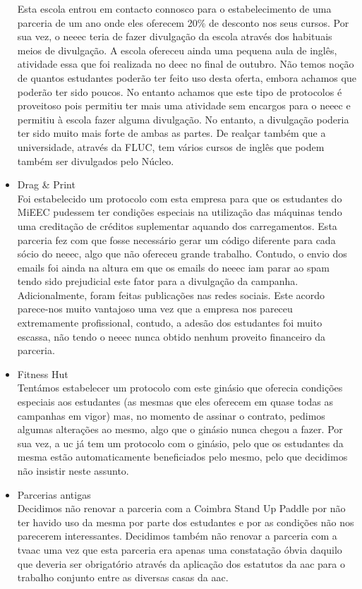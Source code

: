 \begin{itemize}
Esta escola entrou em contacto connosco para o estabelecimento de uma parceria de um ano onde eles oferecem 20\% de desconto nos seus cursos. Por sua vez, o \acrshort{neeec} teria de fazer divulgação da escola através dos habituais meios de divulgação. A escola ofereceu ainda uma pequena aula de inglês, atividade essa que foi realizada no \acrshort{deec} no final de outubro. Não temos noção de quantos estudantes poderão ter feito uso desta oferta, embora achamos que poderão ter sido poucos. No entanto achamos que este tipo de protocolos é proveitoso pois permitiu ter mais uma atividade sem encargos para o \acrshort{neeec} e permitiu à escola fazer alguma divulgação. No entanto, a divulgação poderia ter sido muito mais forte de ambas as partes. De realçar também que a universidade, através da FLUC, tem vários cursos de inglês que podem também ser divulgados pelo Núcleo.
\item Drag \& Print\\
Foi estabelecido um protocolo com esta empresa para que os estudantes do MiEEC pudessem ter condições especiais na utilização das máquinas tendo uma creditação de créditos suplementar aquando dos carregamentos. Esta parceria fez com que fosse necessário gerar um código diferente para cada sócio do \acrshort{neeec}, algo que não ofereceu grande trabalho. Contudo, o envio dos emails foi ainda na altura em que os emails do \acrshort{neeec} iam parar ao spam tendo sido prejudicial este fator para a divulgação da campanha. Adicionalmente, foram feitas publicações nas redes sociais.
Este acordo parece-nos muito vantajoso uma vez que a empresa nos pareceu extremamente profissional, contudo, a adesão dos estudantes foi muito escassa, não tendo o \acrshort{neeec} nunca obtido nenhum proveito financeiro da parceria.
\item Fitness Hut\\
Tentámos estabelecer um protocolo com este ginásio que oferecia condições especiais aos estudantes (as mesmas que eles oferecem em quase todas as campanhas em vigor) mas, no momento de assinar o contrato, pedimos algumas alterações ao mesmo, algo que o ginásio nunca chegou a fazer. Por sua vez, a \acrshort{uc} já tem um protocolo com o ginásio, pelo que os estudantes da mesma estão automaticamente beneficiados pelo mesmo, pelo que decidimos não insistir neste assunto.
\item Parcerias antigas\\
Decidimos não renovar a parceria com a Coimbra Stand Up Paddle por não ter havido uso da mesma por parte dos estudantes e por as condições não nos parecerem interessantes. Decidimos também não renovar a parceria com a \acrshort{tvaac} uma vez que esta parceria era apenas uma constatação óbvia daquilo que deveria ser obrigatório através da aplicação dos estatutos da \acrshort{aac} para o trabalho conjunto entre as diversas casas da \acrshort{aac}.

\end{itemize}
